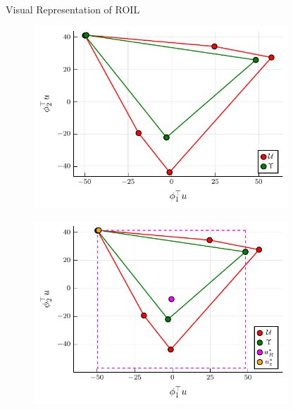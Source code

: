 \begin{block}{Visual Representation of ROIL}
    \begin{center}
        \begin{figure}
            \includegraphics[width=0.85\textwidth]{../../pres_roil/plots/visual_U_and_Upsilon.pdf}
        \end{figure}
        \begin{figure}
            \begin{center}
                \includegraphics[width=0.85\textwidth]{../../pres_roil/plots/visual_solve_cheb.pdf}
            \end{center}
        \end{figure}
    \end{center}
\end{block}

